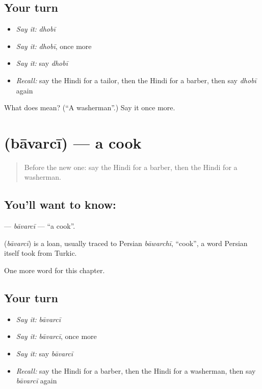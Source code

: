 \subsection*{Your turn}
\begin{itemize}
\raggedright
  \item \emph{Say it:} \emph{dhobī}
  \item \emph{Say it:} \emph{dhobī}, once more
  \item \emph{Say it:} say \emph{dhobī}
  \item \emph{Recall:} say the Hindi for a tailor, then the Hindi for a barber, then say \emph{dhobī} again
\end{itemize}

\begin{tcolorbox}[breakable,colback=teal!4,colframe=teal!35!black,title={Before you move on}]
What does  mean? (\textquotedblleft{}A washerman\textquotedblright{}.) Say it once more.
\end{tcolorbox}
\section[\texorpdfstring{\hi{बावर्ची} (bāvarcī)}{बावर्ची (bāvarcī)}]{ (bāvarcī) — a cook}

\label{lesson:HI-C194-bavarci}



\begin{quote}
Before the new one: say the Hindi for a barber, then the Hindi for a washerman.
\end{quote}

\subsection*{You'll want to know: }
\textbf{} — \emph{bāvarcī} — \textquotedblleft{}a cook\textquotedblright{}.

\begin{cousinweb}
\textbf{} (\emph{bāvarcī}) is a loan, usually traced to Persian \emph{bāwarchī}, \textquotedblleft{}cook\textquotedblright{}, a word Persian itself took from Turkic.
\end{cousinweb}

\begin{grammarlens}[title={What you've built}]
One more word for this chapter.
\end{grammarlens}

\subsection*{Your turn}
\begin{itemize}
\raggedright
  \item \emph{Say it:} \emph{bāvarcī}
  \item \emph{Say it:} \emph{bāvarcī}, once more
  \item \emph{Say it:} say \emph{bāvarcī}
  \item \emph{Recall:} say the Hindi for a barber, then the Hindi for a washerman, then say \emph{bāvarcī} again
\end{itemize}


